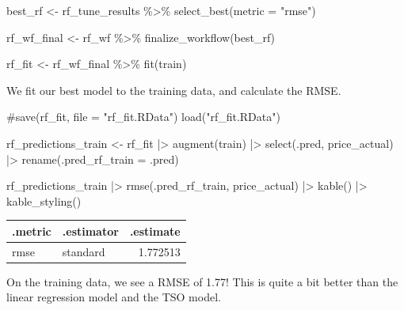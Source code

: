 \documentclass[
]{article}
\newenvironment{Shaded}{\begin{snugshade}}{\end{snugshade}}
\newcommand{\AttributeTok}[1]{\textcolor[rgb]{0.40,0.45,0.13}{#1}}
\newcommand{\CommentTok}[1]{\textcolor[rgb]{0.37,0.37,0.37}{#1}}
\newcommand{\FunctionTok}[1]{\textcolor[rgb]{0.28,0.35,0.67}{#1}}
\newcommand{\NormalTok}[1]{\textcolor[rgb]{0.00,0.23,0.31}{#1}}
\newcommand{\OtherTok}[1]{\textcolor[rgb]{0.00,0.23,0.31}{#1}}
\newcommand{\SpecialCharTok}[1]{\textcolor[rgb]{0.37,0.37,0.37}{#1}}
\newcommand{\StringTok}[1]{\textcolor[rgb]{0.13,0.47,0.30}{#1}}
\begin{document}
\begin{Shaded}
\begin{Highlighting}[]
\NormalTok{best\_rf }\OtherTok{\textless{}{-}}\NormalTok{ rf\_tune\_results }\SpecialCharTok{\%\textgreater{}\%}
  \FunctionTok{select\_best}\NormalTok{(}\AttributeTok{metric =} \StringTok{"rmse"}\NormalTok{)}

\NormalTok{rf\_wf\_final }\OtherTok{\textless{}{-}}\NormalTok{ rf\_wf }\SpecialCharTok{\%\textgreater{}\%}
  \FunctionTok{finalize\_workflow}\NormalTok{(best\_rf)}

\NormalTok{rf\_fit }\OtherTok{\textless{}{-}}\NormalTok{ rf\_wf\_final }\SpecialCharTok{\%\textgreater{}\%}
  \FunctionTok{fit}\NormalTok{(train)}
\end{Highlighting}
\end{Shaded}

We fit our best model to the training data, and calculate the RMSE.

\begin{Shaded}
\begin{Highlighting}[]
\CommentTok{\#save(rf\_fit, file = "rf\_fit.RData")}
\FunctionTok{load}\NormalTok{(}\StringTok{"rf\_fit.RData"}\NormalTok{)}

\NormalTok{rf\_predictions\_train }\OtherTok{\textless{}{-}}\NormalTok{ rf\_fit }\SpecialCharTok{|\textgreater{}}
  \FunctionTok{augment}\NormalTok{(train) }\SpecialCharTok{|\textgreater{}}
  \FunctionTok{select}\NormalTok{(.pred, price\_actual) }\SpecialCharTok{|\textgreater{}}
  \FunctionTok{rename}\NormalTok{(}\AttributeTok{.pred\_rf\_train =}\NormalTok{ .pred)}

\NormalTok{rf\_predictions\_train }\SpecialCharTok{|\textgreater{}}
  \FunctionTok{rmse}\NormalTok{(.pred\_rf\_train, price\_actual) }\SpecialCharTok{|\textgreater{}}
  \FunctionTok{kable}\NormalTok{() }\SpecialCharTok{|\textgreater{}}
  \FunctionTok{kable\_styling}\NormalTok{()}
\end{Highlighting}
\end{Shaded}

\begin{longtable*}[t]{llr}
\toprule
.metric & .estimator & .estimate\\
\midrule
rmse & standard & 1.772513\\
\bottomrule
\end{longtable*}

On the training data, we see a RMSE of 1.77! This is quite a bit better
than the linear regression model and the TSO model.
\end{document}
